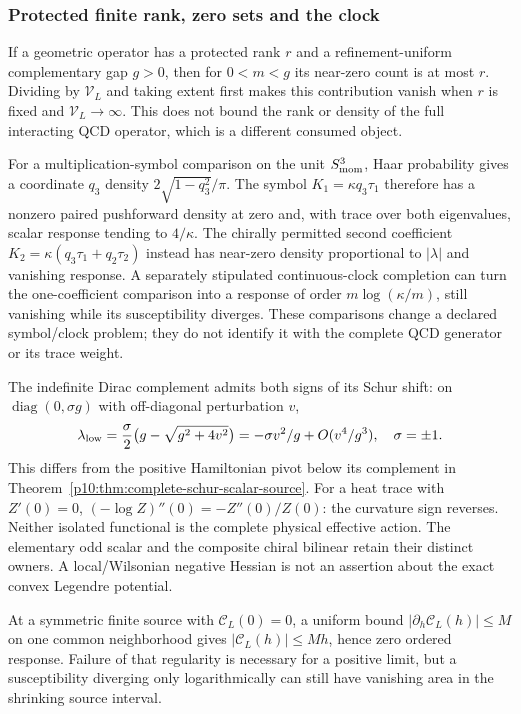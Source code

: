 \documentclass[12pt,a4paper]{article}
\begin{document}
\subsubsection{Protected finite rank, zero sets and the clock}
\label{p10:app:protected-chiral-rank}
If a geometric operator has a protected rank $r$ and a refinement-uniform
complementary gap $g>0$, then for $0<m<g$ its near-zero count is at most
$r$. Dividing by $\mathcal V_L$ and taking extent first makes this
contribution vanish when $r$ is fixed and $\mathcal V_L\to\infty$.
This does not bound the rank or density of the full interacting QCD
operator, which is a different consumed object.

For a multiplication-symbol comparison on the unit $S^3_{\rm mom}$,
Haar probability gives a coordinate $q_3$ density
$2\sqrt{1-q_3^2}/\pi$. The symbol $K_1=\kappa q_3\tau_1$ therefore
has a nonzero paired pushforward density at zero and, with trace over
both eigenvalues, scalar response tending to $4/\kappa$.
The chirally permitted second coefficient
$K_2=\kappa(q_3\tau_1+q_2\tau_2)$ instead has near-zero
density proportional to $|\lambda|$ and vanishing response.
A separately stipulated continuous-clock completion can turn the
one-coefficient comparison into a response of order
$m\log(\kappa/m)$, still vanishing while its susceptibility diverges.
These comparisons change a declared symbol/clock problem; they do not
identify it with the complete QCD generator or its trace weight.

The indefinite Dirac complement admits both signs of its Schur shift:
on $\operatorname{diag}(0,\sigma g)$ with off-diagonal perturbation $v$,
\[
 \lambda_{\rm low}
 =\frac{\sigma}{2}\bigl(g-\sqrt{g^2+4v^2}\bigr)
 =-\sigma v^2/g+O(v^4/g^3),\quad \sigma=\pm1.
\]
This differs from the positive Hamiltonian pivot below its complement
in Theorem~\ref{p10:thm:complete-schur-scalar-source}.
For a heat trace with $Z'(0)=0$,
$(-\log Z)''(0)=-Z''(0)/Z(0)$: the curvature sign reverses.
Neither isolated functional is the complete physical effective action.
The elementary odd scalar and the composite chiral bilinear retain their
distinct owners. A local/Wilsonian negative Hessian is not an assertion
about the exact convex Legendre potential.

At a symmetric finite source with $\mathcal C_L(0)=0$, a uniform bound
$|\partial_h\mathcal C_L(h)|\le M$ on one common neighborhood gives
$|\mathcal C_L(h)|\le Mh$, hence zero ordered response.
Failure of that regularity is necessary for a positive limit, but a
susceptibility diverging only logarithmically can still have vanishing
area in the shrinking source interval.
\end{document}
